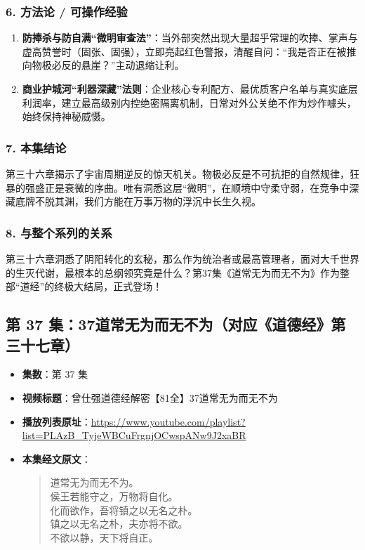 \subsubsection{6. 方法论 / 可操作经验}
\begin{enumerate}
    \item \textbf{防捧杀与防自满“微明审查法”}：当外部突然出现大量超乎常理的吹捧、掌声与虚高赞誉时（固张、固强），立即亮起红色警报，清醒自问：“我是否正在被推向物极必反的悬崖？”主动退缩让利。
    \item \textbf{商业护城河“利器深藏”法则}：企业核心专利配方、最优质客户名单与真实底层利润率，建立最高级别内控绝密隔离机制，日常对外公关绝不作为炒作噱头，始终保持神秘威慑。
\end{enumerate}

\subsubsection{7. 本集结论}
第三十六章揭示了宇宙周期逆反的惊天机关。物极必反是不可抗拒的自然规律，狂暴的强盛正是衰微的序曲。唯有洞悉这层“微明”，在顺境中守柔守弱，在竞争中深藏底牌不脱其渊，我们方能在万事万物的浮沉中长生久视。

\subsubsection{8. 与整个系列的关系}
第三十六章洞悉了阴阳转化的玄秘，那么作为统治者或最高管理者，面对大千世界的生灭代谢，最根本的总纲领究竟是什么？第37集《道常无为而无不为》作为整部“道经”的终极大结局，正式登场！

\clearpage

\subsection{第 37 集：37道常无为而无不为（对应《道德经》第三十七章）}
\label{sec:ep37}

\begin{itemize}
    \item \textbf{集数}：第 37 集
    \item \textbf{视频标题}：曾仕强道德经解密【81全】37道常无为而无不为
    \item \textbf{播放列表原址}：\url{https://www.youtube.com/playlist?list=PLAzB_TyjeWBCuFrgnjOCwspANw9J2xaBR}
    \item \textbf{本集经文原文}：
    \begin{quote}\kaishu
    道常无为而无不为。\\
    侯王若能守之，万物将自化。\\
    化而欲作，吾将镇之以无名之朴。\\
    镇之以无名之朴，夫亦将不欲。\\
    不欲以静，天下将自正。
    \end{quote}
\end{itemize}


